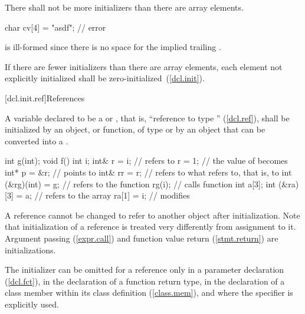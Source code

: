 \pnum
There shall not be more initializers than there are array elements.
\enterexample

\begin{codeblock}
char cv[4] = "asdf";            // error
\end{codeblock}

is ill-formed since there is no space for the implied trailing
.
\exitexample

\pnum
If there are fewer initializers than there are array elements, each element not
explicitly initialized shall be zero-initialized~(\ref{dcl.init}).

[dcl.init.ref]{References}%

\pnum
A variable declared to be a
 or ,
that is, ``reference to type
''
(\ref{dcl.ref}),
shall be initialized by an object, or function, of type
or by an object that can be converted into a
.
\enterexample

\begin{codeblock}
int g(int);
void f() {
  int i;
  int& r = i;                   //  refers to 
  r = 1;                        // the value of  becomes 
  int* p = &r;                  //  points to 
  int& rr = r;                  //  refers to what  refers to, that is, to 
  int (&rg)(int) = g;           //  refers to the function 
  rg(i);                        // calls function 
  int a[3];
  int (&ra)[3] = a;             //  refers to the array 
  ra[1] = i;                    // modifies 
}
\end{codeblock}
\exitexample

\pnum
A reference cannot be changed to refer to another object after initialization.
%
Note that initialization of a reference is treated very differently from assignment
to it.
%
Argument passing (\ref{expr.call})
%
and function value return (\ref{stmt.return}) are initializations.

\pnum
The initializer can be omitted for a reference only in a parameter declaration
(\ref{dcl.fct}), in the declaration of a function return type, in the declaration of
a class member within its class definition (\ref{class.mem}), and where the
specifier is explicitly used.
%
\enterexample

